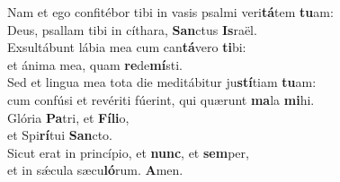 \evenverse Nam et ego confitébor tibi in vasis psalmi veri\textbf{tá}tem \textbf{tu}am:~\*\\
\evenverse Deus, psallam tibi in cíthara, \textbf{San}ctus \textbf{Is}raël.\\
\oddverse Exsultábunt lábia mea cum can\textbf{tá}vero \textbf{ti}bi:~\*\\
\oddverse et ánima mea, quam \textbf{re}de\textbf{mí}sti.\\
\evenverse Sed et lingua mea tota die meditábitur ju\textbf{stí}tiam \textbf{tu}am:~\*\\
\evenverse cum confúsi et revériti fúerint, qui quærunt \textbf{ma}la \textbf{mi}hi.\\
\oddverse Glória \textbf{Pa}tri, et \textbf{Fí}\textbf{li}o,~\*\\
\oddverse et Spi\textbf{rí}tui \textbf{San}cto.\\
\evenverse Sicut erat in princípio, et \textbf{nunc}, et \textbf{sem}per,~\*\\
\evenverse et in sǽcula sæcu\textbf{ló}rum. \textbf{A}men.\\
